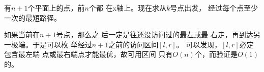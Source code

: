 \begin{prob}
	有$n+1$个平面上的点，前$n$个都
	在x轴上。现在求从$k$号点出发，
	经过每个点至少一次的最短路径。
\end{prob}

\begin{sol}
	如果当前在$n+1$号点，那么之
	后一定是往还没访问过的最左或最
	右走，再到达另一极端。于是可以枚
	举经过$n+1$之前的访问区间$[l,r]$。
	可以发现，$[l,r]$必定包含最左端
	点或最右端点才能最优，故可用区间
	只有$O(n)$个，而验证是$O(1)$的。
\end{sol}
